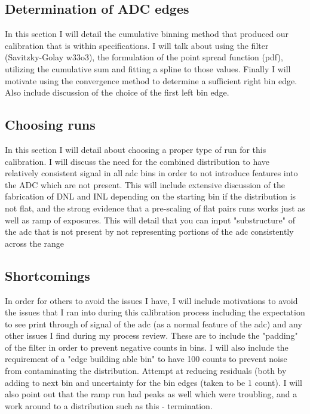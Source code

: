 \documentclass[11pt, letterpaper]{article}
\begin{document}
\subsection{Determination of ADC edges}
In this section I will detail the cumulative binning method that produced our calibration that is within specifications. I will talk about using the filter (Savitzky-Golay w33o3), the formulation of the point spread function (pdf), utilizing the cumulative sum and fitting a spline to those values. Finally I will motivate using the convergence method to determine a sufficient right bin edge. Also include discussion of the choice of the first left bin edge. 

\subsection{Choosing runs}
In this section I will detail about choosing a proper type of run for this calibration. I will discuss the need for the combined distribution to have relatively consistent signal in all adc bins in order to not introduce features into the ADC which are not present. This will include extensive discussion of the fabrication of DNL and INL depending on the starting bin if the distribution is not flat, and the strong evidence that a pre-scaling of flat pairs runs works just as well as ramp of exposures. This will detail that you can input "substructure" of the adc that is not present by not representing portions of the adc consistently across the range

\subsection{Shortcomings}
In order for others to avoid the issues I have, I will include motivations to avoid the issues that I ran into during this calibration process including the expectation to see print through of signal of the adc (as a normal feature of the adc) and any other issues I find during my process review. These are to include the "padding" of the filter in order to prevent negative counts in bins. I will also include the requirement of a "edge building able bin" to have 100 counts to prevent noise from contaminating the distribution. Attempt at reducing residuals (both by adding to next bin and uncertainty for the bin edges (taken to be 1 count). I will also point out that the ramp run had peaks as well which were troubling, and a work around to a distribution such as this - termination. 
\end{document}
